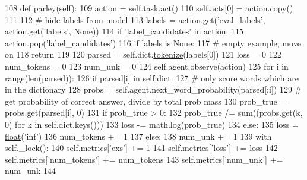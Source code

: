 \begin{DoxyCode}
108     \textcolor{keyword}{def }parley(self):
109         action = self.task.act()
110         self.acts[0] = action.copy()
111 
112         \textcolor{comment}{# hide labels from model}
113         labels = action.get(\textcolor{stringliteral}{'eval\_labels'}, action.get(\textcolor{stringliteral}{'labels'}, \textcolor{keywordtype}{None}))
114         \textcolor{keywordflow}{if} \textcolor{stringliteral}{'label\_candidates'} \textcolor{keywordflow}{in} action:
115             action.pop(\textcolor{stringliteral}{'label\_candidates'})
116         \textcolor{keywordflow}{if} labels \textcolor{keywordflow}{is} \textcolor{keywordtype}{None}:
117             \textcolor{comment}{# empty example, move on}
118             \textcolor{keywordflow}{return}
119 
120         parsed = self.dict.\hyperlink{namespaceparlai_1_1agents_1_1tfidf__retriever_1_1build__tfidf_a1fdb457e98eb4e4c26047e229686a616}{tokenize}(labels[0])
121         loss = 0
122         num\_tokens = 0
123         num\_unk = 0
124         self.agent.observe(action)
125         \textcolor{keywordflow}{for} i \textcolor{keywordflow}{in} range(len(parsed)):
126             \textcolor{keywordflow}{if} parsed[i] \textcolor{keywordflow}{in} self.dict:
127                 \textcolor{comment}{# only score words which are in the dictionary}
128                 probs = self.agent.next\_word\_probability(parsed[:i])
129                 \textcolor{comment}{# get probability of correct answer, divide by total prob mass}
130                 prob\_true = probs.get(parsed[i], 0)
131                 \textcolor{keywordflow}{if} prob\_true > 0:
132                     prob\_true /= sum((probs.get(k, 0) \textcolor{keywordflow}{for} k \textcolor{keywordflow}{in} self.dict.keys()))
133                     loss -= math.log(prob\_true)
134                 \textcolor{keywordflow}{else}:
135                     loss = \hyperlink{namespaceprojects_1_1controllable__dialogue_1_1make__control__dataset_aa2b7207688c641dbc094ab44eca27113}{float}(\textcolor{stringliteral}{'inf'})
136                 num\_tokens += 1
137             \textcolor{keywordflow}{else}:
138                 num\_unk += 1
139         with self.\_lock():
140             self.metrics[\textcolor{stringliteral}{'exs'}] += 1
141             self.metrics[\textcolor{stringliteral}{'loss'}] += loss
142             self.metrics[\textcolor{stringliteral}{'num\_tokens'}] += num\_tokens
143             self.metrics[\textcolor{stringliteral}{'num\_unk'}] += num\_unk
144 
\end{DoxyCode}
\mbox{\label{classparlai_1_1scripts_1_1eval__ppl_1_1PerplexityWorld_ae3b38df8869d22000b5bb570de883c1f}} 
